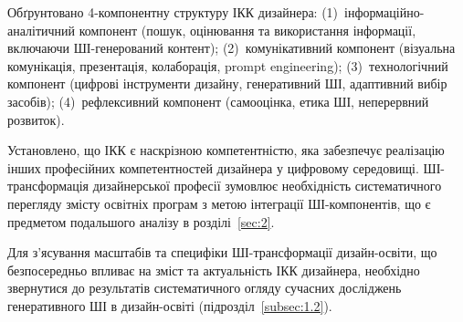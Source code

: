 Обґрунтовано 4-компонентну структуру ІКК дизайнера: (1)~інформаційно-аналітичний компонент (пошук, оцінювання та використання інформації, включаючи ШІ-генерований контент); (2)~комунікативний компонент (візуальна комунікація, презентація, колаборація, prompt engineering); (3)~технологічний компонент (цифрові інструменти дизайну, генеративний ШІ, адаптивний вибір засобів); (4)~рефлексивний компонент (самооцінка, етика ШІ, неперервний розвиток).

Установлено, що ІКК є наскрізною компетентністю, яка забезпечує реалізацію інших професійних компетентностей дизайнера у цифровому середовищі. ШІ-трансформація дизайнерської професії зумовлює необхідність систематичного перегляду змісту освітніх програм з метою інтеграції ШІ-компонентів, що є предметом подальшого аналізу в розділі~\ref{sec:2}.

Для з'ясування масштабів та специфіки ШІ-трансформації дизайн-освіти, що безпосередньо впливає на зміст та актуальність ІКК дизайнера, необхідно звернутися до результатів систематичного огляду сучасних досліджень генеративного ШІ в дизайн-освіті (підрозділ~\ref{subsec:1.2}).
